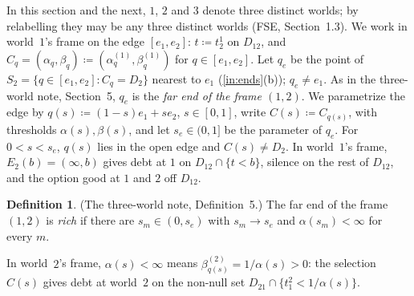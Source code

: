 \documentclass[11pt]{article}
\theoremstyle{definition}\newtheorem{definition}[theorem]{Definition}
\theoremstyle{remark}\newtheorem{remark}[theorem]{Remark}
\begin{document}
In this section and the next, $1$, $2$ and $3$ denote three distinct worlds;
by relabelling they may be any three distinct worlds (FSE, Section~1.3).
We work in world~$1$'s frame on the edge $[e_1,e_2]$:
$t\coloneqq t^1_2$ on $D_{12}$, and $C_q=(\alpha_q,\beta_q)\coloneqq
(\alpha^{(1)}_q,\beta^{(1)}_q)$ for $q\in[e_1,e_2]$. Let $q_e$ be the point
of $S_2=\{q\in[e_1,e_2]:C_q=D_2\}$ nearest to $e_1$ (\ref{in:ends}(b));
$q_e\ne e_1$. As in the three-world note, Section~5, $q_e$ is the \emph{far
end of the frame $(1,2)$}. We parametrize the edge by
$q(s)\coloneqq(1-s)e_1+se_2$, $s\in[0,1]$, write $C(s)\coloneqq C_{q(s)}$,
with thresholds $\alpha(s),\beta(s)$, and let $s_e\in(0,1]$ be the
parameter of $q_e$. For $0<s<s_e$, $q(s)$ lies in the open edge and
$C(s)\ne D_2$. In world~$1$'s frame, $E_2(b)=(\infty,b)$ gives debt at $1$
on $D_{12}\cap\{t<b\}$, silence on the rest of $D_{12}$, and the option
good at $1$ and $2$ off $D_{12}$.

\begin{definition}\label{def:rich}
(The three-world note, Definition~5.) The far end of the frame $(1,2)$ is
\emph{rich} if there are $s_m\in(0,s_e)$ with $s_m\to s_e$ and
$\alpha(s_m)<\infty$ for every $m$.
\end{definition}

In world~$2$'s frame, $\alpha(s)<\infty$ means
$\beta^{(2)}_{q(s)}=1/\alpha(s)>0$: the selection $C(s)$ gives debt at
world~$2$ on the non-null set $D_{21}\cap\{t^2_1<1/\alpha(s)\}$.
\end{document}
